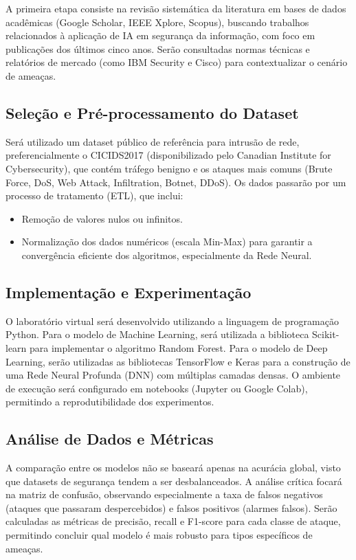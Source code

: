 \documentclass[12pt,oneside]{abntex2}
\begin{document}
A primeira etapa consiste na revisão sistemática da literatura em bases de dados acadêmicas (Google Scholar, IEEE Xplore, Scopus), buscando trabalhos relacionados à aplicação de IA em segurança da informação, com foco em publicações dos últimos cinco anos. Serão consultadas normas técnicas e relatórios de mercado (como IBM Security e Cisco) para contextualizar o cenário de ameaças.

\subsection{Seleção e Pré-processamento do Dataset}

Será utilizado um dataset público de referência para intrusão de rede, preferencialmente o CICIDS2017 (disponibilizado pelo Canadian Institute for Cybersecurity), que contém tráfego benigno e os ataques mais comuns (Brute Force, DoS, Web Attack, Infiltration, Botnet, DDoS). Os dados passarão por um processo de tratamento (ETL), que inclui:

\begin{itemize}
\item Remoção de valores nulos ou infinitos.
\item Normalização dos dados numéricos (escala Min-Max) para garantir a convergência eficiente dos algoritmos, especialmente da Rede Neural.
\end{itemize}

\subsection{Implementação e Experimentação}

O laboratório virtual será desenvolvido utilizando a linguagem de programação Python. Para o modelo de Machine Learning, será utilizada a biblioteca Scikit-learn para implementar o algoritmo Random Forest. Para o modelo de Deep Learning, serão utilizadas as bibliotecas TensorFlow e Keras para a construção de uma Rede Neural Profunda (DNN) com múltiplas camadas densas. O ambiente de execução será configurado em notebooks (Jupyter ou Google Colab), permitindo a reprodutibilidade dos experimentos.

\subsection{Análise de Dados e Métricas}

A comparação entre os modelos não se baseará apenas na acurácia global, visto que datasets de segurança tendem a ser desbalanceados. A análise crítica focará na matriz de confusão, observando especialmente a taxa de falsos negativos (ataques que passaram despercebidos) e falsos positivos (alarmes falsos). Serão calculadas as métricas de precisão, recall e F1-score para cada classe de ataque, permitindo concluir qual modelo é mais robusto para tipos específicos de ameaças.
\end{document}
